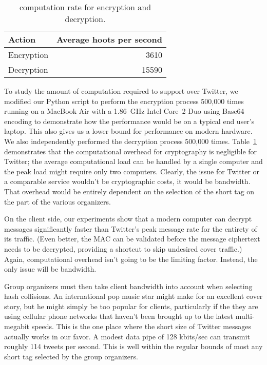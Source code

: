 \begin{table}
\caption{\hoot computation rate for encryption and
  decryption.\label{tab:hps}}
\begin{center}
    \begin{tabular}{ l  r }
	Action & Average hoots per second \\ \hline
	Encryption & 3610 \\
	Decryption & 15590 
    \end{tabular}
\end{center}
\end{table}

To study the amount of computation required to support \hoot over
Twitter, we modified our Python script to perform the encryption process 
500,000 times running on a MacBook
Air with a 1.86~GHz Intel Core~2 Duo using Base64 encoding to demonstrate how the performance would be on a typical end user's laptop. This also gives us a lower bound for performance on modern hardware. We 
also independently performed the decryption process 500,000 times. 
Table~\ref{tab:hps} demonstrates that the computational overhead
for \hoot cryptography is negligible for Twitter; the average
computational load can be handled by a single computer and the peak
load might require only two computers. Clearly, the issue for Twitter
or a comparable service wouldn't be cryptographic costs, it would be
bandwidth. That overhead would be entirely dependent on the selection
of the short tag on the part of the various \hoot organizers. 

On the client side, our experiments show that a modern computer can
decrypt \hoot messages significantly faster than Twitter's peak
message rate for the entirety of its traffic. (Even better, the MAC
can be validated before the message ciphertext needs to be decrypted,
providing a shortcut to skip undesired cover traffic.)  Again,
computational overhead isn't going to be the limiting factor.
Instead, the only issue will be bandwidth.

Group organizers must then take client bandwidth into account when
selecting hash collisions. An international pop music star might make
for an excellent cover story, but he might simply be too popular for
clients, particularly if the they are using cellular phone networks
that haven't been brought up to the latest multi-megabit speeds.
This is the one place where the short size of Twitter
messages actually works in our favor. A modest data pipe of 128
kbits/sec can transmit roughly 114 tweets per second. This is well
within the regular bounds of most any short tag selected by the group
organizers.

